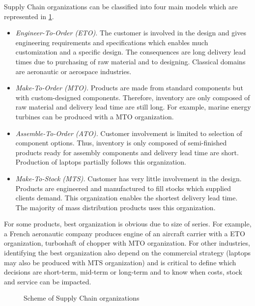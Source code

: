 Supply Chain organizations can be classified into four main models \cite{arnold2007} which are represented in \cref{fig:supply-chain-models}.
\begin{itemize}
  \item \emph{Engineer-To-Order (ETO).}
  The customer is involved in the design and gives engineering requirements and specifications which enables much customization and a specific design.
  The consequences are long delivery lead times due to purchasing of raw material and to designing.
  Classical domains are aeronautic or aerospace industries.
  \item \emph{Make-To-Order (MTO).}
  Products are made from standard components but with custom-designed components.
  Therefore, inventory are only composed of raw material and delivery lead time are still long.
  For example, marine energy turbines can be produced with a MTO organization.
  \item \emph{Assemble-To-Order (ATO).}
  Customer involvement is limited to selection of component options.
  Thus, inventory is only composed of semi-finished products ready for assembly components and delivery lead time are short.
  Production of laptops partially follows this organization.
  \item \emph{Make-To-Stock (MTS).}
  Customer has very little involvement in the design.
  Products are engineered and manufactured to fill stocks which supplied clients demand.
  This organization enables the shortest delivery lead time.
  The majority of mass distribution products uses this organization.
\end{itemize}
For some products, best organization is obvious due to size of series.
For example, a French aeronautic company produces engine of an aircraft carrier with a ETO organization, turboshaft of chopper with MTO organization.
For other industries, identifying the best organization also depend on the commercial strategy (laptops may also be produced with MTS organization) and is critical to define which decisions are short-term, mid-term or long-term and to know when costs, stock and service can be impacted.


\begin{figure}[h]
  \centering
  \caption{Scheme of Supply Chain organizations}
  \label{fig:supply-chain-models}
\end{figure}



